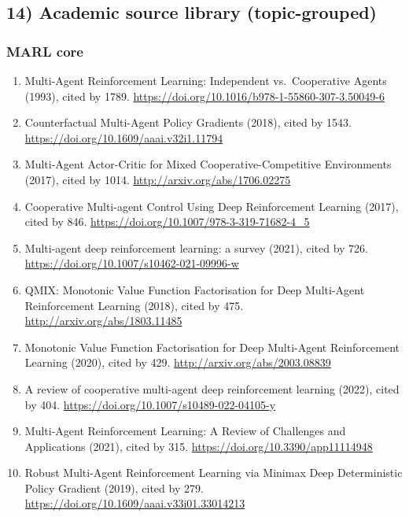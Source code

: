 \documentclass[11pt]{article}
\begin{document}
\hypertarget{academic-source-library-topic-grouped}{%
\subsection{14) Academic source library
(topic-grouped)}\label{academic-source-library-topic-grouped}}

\hypertarget{marl-core}{%
\subsubsection{MARL core}\label{marl-core}}

\begin{enumerate}
\def\labelenumi{\arabic{enumi}.}
\tightlist
\item
  Multi-Agent Reinforcement Learning: Independent vs.~Cooperative Agents
  (1993), cited by 1789.
  \url{https://doi.org/10.1016/b978-1-55860-307-3.50049-6}
\item
  Counterfactual Multi-Agent Policy Gradients (2018), cited by 1543.
  \url{https://doi.org/10.1609/aaai.v32i1.11794}
\item
  Multi-Agent Actor-Critic for Mixed Cooperative-Competitive
  Environments (2017), cited by 1014.
  \url{http://arxiv.org/abs/1706.02275}
\item
  Cooperative Multi-agent Control Using Deep Reinforcement Learning
  (2017), cited by 846.
  \url{https://doi.org/10.1007/978-3-319-71682-4_5}
\item
  Multi-agent deep reinforcement learning: a survey (2021), cited by
  726. \url{https://doi.org/10.1007/s10462-021-09996-w}
\item
  QMIX: Monotonic Value Function Factorisation for Deep Multi-Agent
  Reinforcement Learning (2018), cited by 475.
  \url{http://arxiv.org/abs/1803.11485}
\item
  Monotonic Value Function Factorisation for Deep Multi-Agent
  Reinforcement Learning (2020), cited by 429.
  \url{http://arxiv.org/abs/2003.08839}
\item
  A review of cooperative multi-agent deep reinforcement learning
  (2022), cited by 404. \url{https://doi.org/10.1007/s10489-022-04105-y}
\item
  Multi-Agent Reinforcement Learning: A Review of Challenges and
  Applications (2021), cited by 315.
  \url{https://doi.org/10.3390/app11114948}
\item
  Robust Multi-Agent Reinforcement Learning via Minimax Deep
  Deterministic Policy Gradient (2019), cited by 279.
  \url{https://doi.org/10.1609/aaai.v33i01.33014213}

\end{enumerate}
\end{document}
